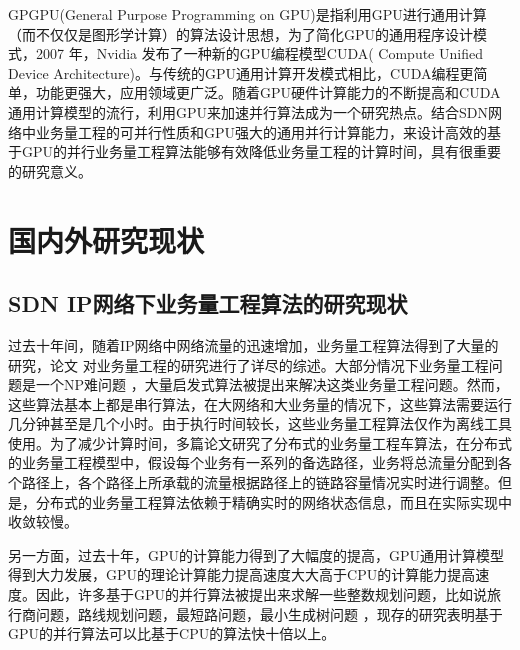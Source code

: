 \documentclass[master]{thesis-uestc}
\begin{document}
GPGPU(General Purpose Programming on GPU)是指利用GPU进行通用计算（而不仅仅是图形学计算）的算法设计思想，为了简化GPU的通用程序设计模式，2007 年，Nvidia 发布了一种新的GPU编程模型CUDA( Compute Unified Device Architecture)。与传统的GPU通用计算开发模式相比，CUDA编程更简单，功能更强大，应用领域更广泛。随着GPU硬件计算能力的不断提高和CUDA通用计算模型的流行，利用GPU来加速并行算法成为一个研究热点。结合SDN网络中业务量工程的可并行性质和GPU强大的通用并行计算能力，来设计高效的基于GPU的并行业务量工程算法能够有效降低业务量工程的计算时间，具有很重要的研究意义。



\section{国内外研究现状}
\subsection{SDN IP网络下业务量工程算法的研究现状}
过去十年间，随着IP网络中网络流量的迅速增加，业务量工程算法得到了大量的研究，论文 对业务量工程的研究进行了详尽的综述。大部分情况下业务量工程问题是一个NP难问题 ，大量启发式算法被提出来解决这类业务量工程问题。然而，这些算法基本上都是串行算法，在大网络和大业务量的情况下，这些算法需要运行几分钟甚至是几个小时。由于执行时间较长，这些业务量工程算法仅作为离线工具使用。为了减少计算时间，多篇论文研究了分布式的业务量工程车算法，在分布式的业务量工程模型中，假设每个业务有一系列的备选路径，业务将总流量分配到各个路径上，各个路径上所承载的流量根据路径上的链路容量情况实时进行调整。但是，分布式的业务量工程算法依赖于精确实时的网络状态信息，而且在实际实现中收敛较慢。

另一方面，过去十年，GPU的计算能力得到了大幅度的提高，GPU通用计算模型得到大力发展，GPU的理论计算能力提高速度大大高于CPU的计算能力提高速度。因此，许多基于GPU的并行算法被提出来求解一些整数规划问题，比如说旅行商问题，路线规划问题，最短路问题，最小生成树问题 ，现存的研究表明基于GPU的并行算法可以比基于CPU的算法快十倍以上。
\end{document}
